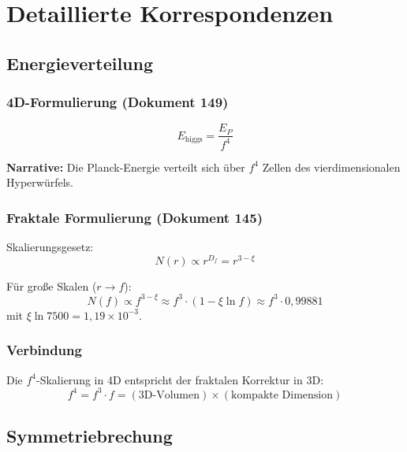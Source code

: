 	\section{Detaillierte Korrespondenzen}
	
	\subsection{Energieverteilung}
	
	\subsubsection{4D-Formulierung (Dokument 149)}
	
	\begin{equation}
		E_{\text{higgs}} = \frac{E_P}{f^4}
	\end{equation}
	
	\textbf{Narrative:} Die Planck-Energie verteilt sich über $f^4$ Zellen des vierdimensionalen Hyperwürfels.
	
	\subsubsection{Fraktale Formulierung (Dokument 145)}
	
	Skalierungsgesetz:
	\begin{equation}
		N(r) \propto r^{D_f} = r^{3-\xi}
	\end{equation}
	
	Für große Skalen ($r \to f$):
	\begin{equation}
		N(f) \propto f^{3-\xi} \approx f^3 \cdot (1 - \xi \ln f) \approx f^3 \cdot 0{,}99881
	\end{equation}
	mit $\xi \ln 7500 = 1{,}19\times10^{-3}$.
	
	\subsubsection{Verbindung}
	
	Die $f^4$-Skalierung in 4D entspricht der fraktalen Korrektur in 3D:
	\begin{equation}
		\boxed{f^4 = f^3 \cdot f = (\text{3D-Volumen}) \times (\text{kompakte Dimension})}
	\end{equation}
	
	\subsection{Symmetriebrechung}
	
